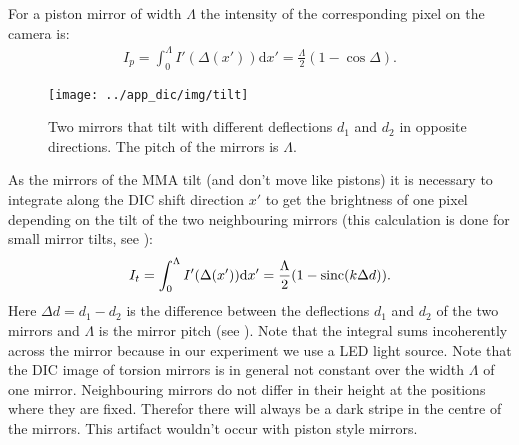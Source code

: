 For a piston mirror of width $\Lambda$ the intensity of the
corresponding pixel on the camera is:
\begin{align}
  I_p=\int_0^\Lambda I'(\Delta(x'))\textrm{d}x'=\frac{\Lambda}{2}(1-\cos \Delta).
\end{align}
\begin{figure}[ht]
  \centering
  \texttt{[image: ../app\_dic/img/tilt]}
  \caption{ Two mirrors that tilt with different deflections $d_1$ and
    $d_2$ in opposite directions. The pitch of the mirrors is
    $\Lambda$.}
  \label{fig:tilt}
\end{figure}
As the mirrors of the MMA tilt (and don't move like pistons) it is
necessary to integrate along the DIC shift direction $x'$ to get the
brightness of one pixel depending on the tilt of the two neighbouring
mirrors (this calculation is done for small mirror tilts, see
): %
\begin{align}
\label{eqn:it}
  I_t=\int_0^\Lambda I'(\Delta(x')) \textrm{d}x'=\frac{\Lambda}{2}(1-\operatorname*{sinc}(k \Delta d)).
\end{align}
Here $\Delta d=d_1-d_2$ is the difference between the deflections
$d_1$ and $d_2$ of the two mirrors and $\Lambda$ is the mirror pitch
(see ). Note that the integral sums incoherently
across the mirror because in our experiment we use a LED light
source. Note that the DIC image of torsion mirrors is in general not
constant over the width $\Lambda$ of one mirror. Neighbouring mirrors
do not differ in their height at the positions where they are
fixed. Therefor there will always be a dark stripe in the centre of
the mirrors. This artifact wouldn't occur with piston style mirrors.

